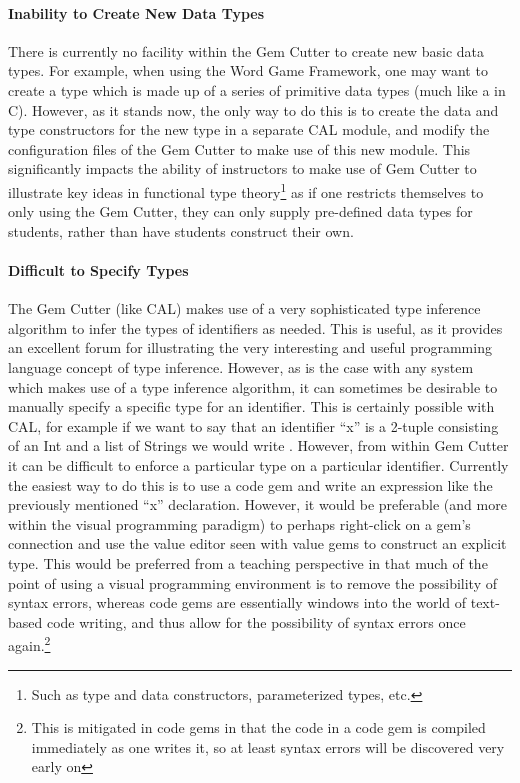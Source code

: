 \paragraph{Inability to Create New Data Types}

There is currently no facility within the Gem Cutter to create new basic data types.  For example, when using the Word Game Framework, one may want to create a  type which is made up of a series of primitive data types (much like a  in C).  However, as it stands now, the only way to do this is to create the data and type constructors for the new type in a separate CAL module, and modify the configuration files of the Gem Cutter to make use of this new module.  This significantly impacts the ability of instructors to make use of Gem Cutter to illustrate key ideas in functional type theory\footnote{Such as type and data constructors, parameterized types, etc.} as if one restricts themselves to only using the Gem Cutter, they can only supply pre-defined data types for students, rather than have students construct their own.

\paragraph{Difficult to Specify Types}

The Gem Cutter (like CAL) makes use of a very sophisticated type inference algorithm to infer the types of identifiers as needed.  This is useful, as it provides an excellent forum for illustrating the very interesting and useful programming language concept of type inference.  However, as is the case with any system which makes use of a type inference algorithm, it can sometimes be desirable to manually specify a specific type for an identifier.  This is certainly possible with CAL, for example if we want to say that an identifier ``x'' is a 2-tuple consisting of an Int and a list of Strings we would write .  However, from within Gem Cutter it can be difficult to enforce a particular type on a particular identifier.  Currently the easiest way to do this is to use a code gem and write an expression like the previously mentioned ``x'' declaration.  However, it would be preferable (and more within the visual programming paradigm) to perhaps right-click on a gem's connection and use the value editor seen with value gems to construct an explicit type.  This would be preferred from a teaching perspective in that much of the point of using a visual programming environment is to remove the possibility of syntax errors, whereas code gems are essentially windows into the world of text-based code writing, and thus allow for the possibility of syntax errors once again.\footnote{This is mitigated in code gems in that the code in a code gem is compiled immediately as one writes it, so at least syntax errors will be discovered very early on}

